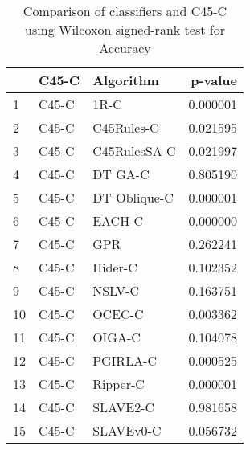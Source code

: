 \begin{table}
\footnotesize
\caption{Comparison of classifiers and C45-C using Wilcoxon signed-rank test for Accuracy}
\label{tab:C45-C wilcoxon Accuracy comparison}
\begin{tabular}{lllr}
\hline
 & C45-C & Algorithm & p-value \\
\hline
1 & C45-C & 1R-C & 0.000001 \\
2 & C45-C & C45Rules-C & 0.021595 \\
3 & C45-C & C45RulesSA-C & 0.021997 \\
4 & C45-C & DT GA-C & 0.805190 \\
5 & C45-C & DT Oblique-C & 0.000001 \\
6 & C45-C & EACH-C & 0.000000 \\
7 & C45-C & GPR & 0.262241 \\
8 & C45-C & Hider-C & 0.102352 \\
9 & C45-C & NSLV-C & 0.163751 \\
10 & C45-C & OCEC-C & 0.003362 \\
11 & C45-C & OIGA-C & 0.104078 \\
12 & C45-C & PGIRLA-C & 0.000525 \\
13 & C45-C & Ripper-C & 0.000001 \\
14 & C45-C & SLAVE2-C & 0.981658 \\
15 & C45-C & SLAVEv0-C & 0.056732 \\
\hline
\end{tabular}
\end{table}
